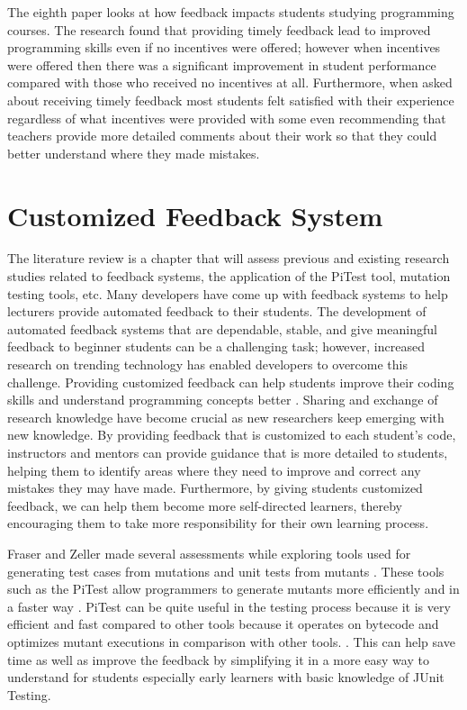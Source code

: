 The eighth paper looks at how feedback impacts students studying programming courses. The research found that providing timely feedback lead to improved programming skills even if no incentives were offered; however when incentives were offered then there was a significant improvement in student performance compared with those who received no incentives at all. Furthermore, when asked about receiving timely feedback most students felt satisfied with their experience regardless of what incentives were provided with some even recommending that teachers provide more detailed comments about their work so that they could better understand where they made mistakes. \par



\section{Customized Feedback System}
The literature review is a chapter that will assess previous and existing research studies related to feedback systems, the application of the PiTest tool, mutation testing tools, etc. Many developers have come up with feedback systems to help lecturers provide automated feedback to their students. The development of automated feedback systems that are dependable, stable, and give meaningful feedback to beginner students can be a challenging task; however, increased research on trending technology has enabled developers to overcome this challenge. Providing customized feedback can help students improve their coding skills and understand programming concepts better \cite{ref12}. Sharing and exchange of research knowledge have become crucial as new researchers keep emerging with new knowledge. By providing feedback that is customized to each student's code, instructors and mentors can provide guidance that is more detailed to students, helping them to identify areas where they need to improve and correct any mistakes they may have made. Furthermore, by giving students customized feedback, we can help them become more self-directed learners, thereby encouraging them to take more responsibility for their own learning process.\par 
Fraser and Zeller made several assessments while exploring tools used for generating test cases from mutations and unit tests from mutants \cite{ref13}. These tools such as the PiTest allow programmers to generate mutants more efficiently and in a faster way \cite{ref14}. PiTest can be quite useful in the testing process because it is very efficient and fast compared to other tools because it operates on bytecode and optimizes mutant executions in comparison with other tools. \cite{ref15}. This can help save time as well as improve the feedback by simplifying it in a more easy way to understand for students especially early learners with basic knowledge of JUnit Testing. \par 
